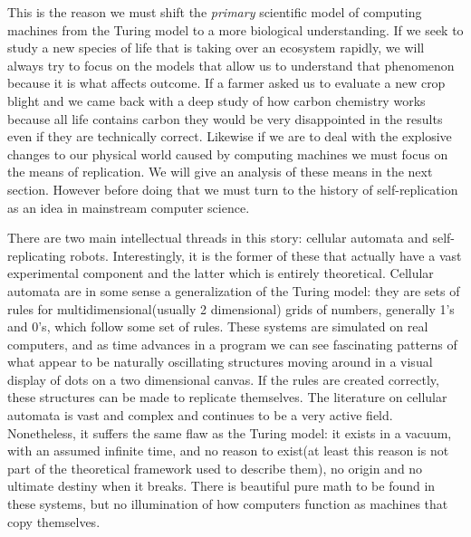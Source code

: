 \documentclass[12pt,a4paper]{amsart}
\numberwithin{equation}{section}
\begin{document}
This is the reason we must shift the \emph{primary} scientific model of
computing machines from the Turing model to a more biological
understanding. If we seek to study a new species of life that is taking
over an ecosystem rapidly, we will always try to focus on the models
that allow us to understand that phenomenon because it is what affects
outcome. If a farmer asked us to evaluate a new crop blight and we came
back with a deep study of how carbon chemistry works because all life
contains carbon they would be very disappointed in the results even if
they are technically correct. Likewise if we are to deal with the
explosive changes to our physical world caused by computing machines we
must focus on the means of replication. We will give an analysis of
these means in the next section. However before doing that we must turn
to the history of self-replication as an idea in mainstream computer
science.

There are two main intellectual threads in this story: cellular automata
and self-replicating robots. Interestingly, it is the former of these
that actually have a vast experimental component and the latter which is
entirely theoretical. Cellular automata are in some sense a
generalization of the Turing model: they are sets of rules for
multidimensional(usually 2 dimensional) grids of numbers, generally 1's
and 0's, which follow some set of rules. These systems are simulated on
real computers, and as time advances in a program we can see fascinating
patterns of what appear to be naturally oscillating structures moving
around in a visual display of dots on a two dimensional canvas. If the
rules are created correctly, these structures can be made to replicate
themselves. The literature on cellular automata is vast and complex and
continues to be a very active field. Nonetheless, it suffers the same
flaw as the Turing model: it exists in a vacuum, with an assumed
infinite time, and no reason to exist(at least this reason is not part
of the theoretical framework used to describe them), no origin and no
ultimate destiny when it breaks. There is beautiful pure math to be
found in these systems, but no illumination of how computers function as
machines that copy themselves.
\end{document}
